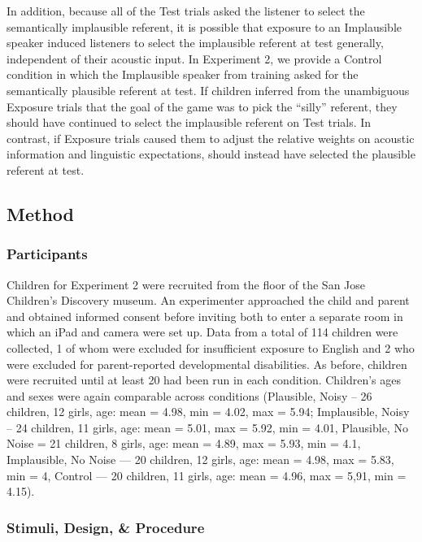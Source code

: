 \documentclass[man,floatsintext]{apa6}
\begin{document}
In addition, because all of the Test trials asked the listener to select the semantically implausible referent, it is possible that exposure to an Implausible speaker induced listeners to select the implausible referent at test generally, independent of their acoustic input.  In Experiment 2, we provide a Control condition in which the Implausible speaker from training asked for the semantically plausible referent at test. If children inferred from the unambiguous Exposure trials that the goal of the game was to pick the ``silly'' referent, they should have continued to select the implausible referent on Test trials. In contrast, if Exposure trials caused them to adjust the relative weights on acoustic information and linguistic expectations, should instead have selected the plausible referent at test.

\subsection{Method}

\subsubsection{Participants}

Children for Experiment 2 were recruited from the floor of the San Jose Children's Discovery museum. An experimenter approached the child and parent and obtained informed consent before inviting both to enter a separate room in which an iPad and camera were set up. Data from a total of 114 children were collected, 1 of whom were excluded for insufficient exposure to English and 2 who were excluded for parent-reported developmental disabilities. As before, children were recruited until at least 20 had been run in each condition. Children's ages and sexes were again comparable across conditions (Plausible, Noisy -- 26 children, 12 girls, age: mean = 4.98, min = 4.02, max = 5.94; Implausible, Noisy -- 24 children, 11 girls, age: mean = 5.01, max = 5.92, min = 4.01, Plausible, No Noise = 21 children, 8 girls, age: mean = 4.89, max = 5.93, min = 4.1, Implausible, No Noise --- 20 children, 12 girls, age: mean = 4.98, max = 5.83, min = 4, Control --- 20 children, 11 girls, age: mean = 4.96, max = 5,91, min = 4.15).
 
\subsubsection{Stimuli, Design, \& Procedure}
\end{document}
